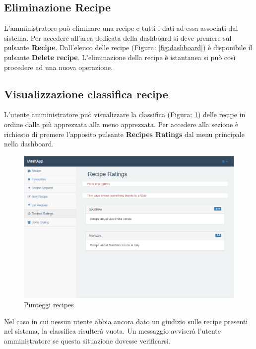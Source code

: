 	\subsection{Eliminazione Recipe}
		L'amministratore può eliminare una recipe\gloss{} e tutti i dati ad essa associati dal sistema.\newline
		Per accedere all'area dedicata della dashboard\gloss{} si deve premere sul pulsante \textbf{Recipe}\gloss{}. Dall'elenco delle recipe\gloss{} (Figura: \ref{fig:dashboard}) è disponibile il pulsante \textbf{Delete recipe}.
		L'eliminazione della recipe è istantanea si può così procedere ad una nuova operazione.

	
	\subsection{Visualizzazione classifica recipe}
		L'utente amministratore può visualizzare la classifica (Figura: \ref{fig:votazioni_ricette}) delle recipe\gloss{} in ordine dalla più apprezzata alla meno apprezzata.\newline
		Per accedere alla sezione è richiesto di premere l'apposito pulsante \textbf{Recipes Ratings} dal menu principale nella dashboard\gloss{}.\newline
		\begin{figure}[H]
			\centering
			\centerline{\includegraphics[width=14cm]{images/votazioni_ricette.png}}
			\caption{Punteggi recipes}
			\label{fig:votazioni_ricette}
		\end{figure}
		Nel caso in cui nessun utente abbia ancora dato un giudizio sulle recipe presenti nel sistema, la classifica risulterà vuota.\newline
		Un messaggio avviserà l'utente amministratore se questa situazione dovesse verificarsi.


